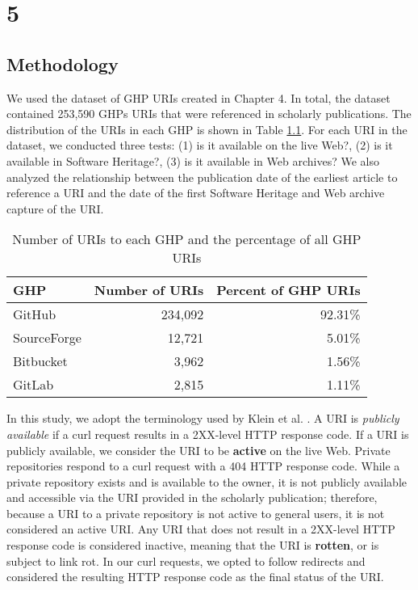\chapter{5}
\label{ch:5}


\section{Methodology}
We used the dataset of GHP URIs created in Chapter 4. In total, the dataset contained 253,590 GHPs URIs that were referenced in scholarly publications. The distribution of the URIs in each GHP is shown in Table \ref{tab:ghps}. For each URI in the dataset, we conducted three tests: (1) is it available on the live Web?, (2) is it available in Software Heritage?, (3) is it available in Web archives? We also analyzed the relationship between the publication date of the earliest article to reference a URI and the date of the first Software Heritage and Web archive capture of the URI. 

\begin{table}
    \centering
    \begin{tabular}{|l|r|r|}
    \hline
    GHP & Number of URIs & Percent of GHP URIs\\ 
    \hline
    GitHub & 234,092 & 92.31\% \\
    SourceForge & 12,721 & 5.01\% \\
    Bitbucket & 3,962 & 1.56\% \\
    GitLab & 2,815 & 1.11\% \\
    \hline
    \end{tabular}
    \caption{Number of URIs to each GHP and the percentage of all GHP URIs}
    \label{tab:ghps}
\end{table}

In this study, we adopt the terminology used by Klein et al. \cite{klein-plos2014}. A URI is \emph{publicly available} if a curl request results in a 2XX-level HTTP response code. If a URI is publicly available, we consider the URI to be \textbf{active} on the live Web. Private repositories respond to a curl request with a 404 HTTP response code. While a private repository exists and is available to the owner, it is not publicly available and accessible via the URI provided in the scholarly publication; therefore, because a URI to a private repository is not active to general users, it is not considered an active URI. Any URI that does not result in a 2XX-level HTTP response code is considered inactive, meaning that the URI is \textbf{rotten}, or is subject to link rot. In our curl requests, we opted to follow redirects and considered the resulting HTTP response code as the final status of the URI. 


